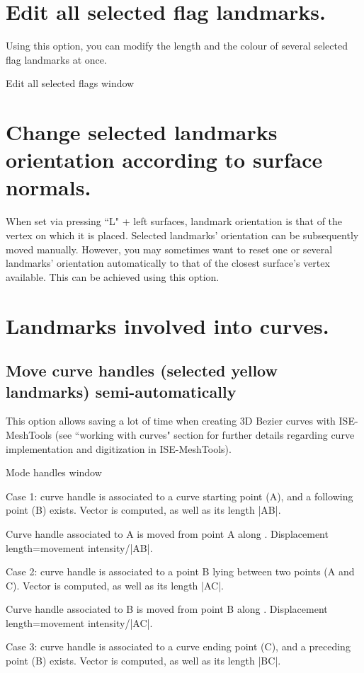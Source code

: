 \section{Edit all selected flag landmarks.}
Using this option, you can modify the length and the colour
of several selected flag landmarks at once.

Edit all selected flags window


\section{Change selected landmarks orientation according to surface normals.}
When set via pressing ``L" + left surfaces, landmark orientation is that of the vertex on which it is
placed. Selected landmarks’ orientation can be subsequently moved manually. However, you may
sometimes want to reset one or several landmarks’ orientation automatically to that of the closest
surface’s vertex available. This can be achieved using this option.



\section{Landmarks involved into curves.}

\subsection{Move curve handles (selected yellow
landmarks) semi-automatically}
This option allows saving a lot of time when creating
3D Bezier curves with ISE-MeshTools (see ``working
with curves" section for further details regarding curve
implementation and digitization in ISE-MeshTools).


Mode handles window


Case 1: curve handle is associated to a curve
starting point (A), and a following point (B) exists.
Vector is computed, as well as its length
|AB|.


Curve handle associated to A is moved
from point A along . Displacement
length=movement intensity/|AB|.

Case 2: curve handle is associated to a point B
lying between two points (A and C). Vector is
computed, as well as its length |AC|.

Curve handle associated to B is moved
from point B along . Displacement
length=movement intensity/|AC|.

Case 3: curve handle is associated to a curve
ending point (C), and a preceding point (B) exists.
Vector is computed, as well as its length
|BC|.

